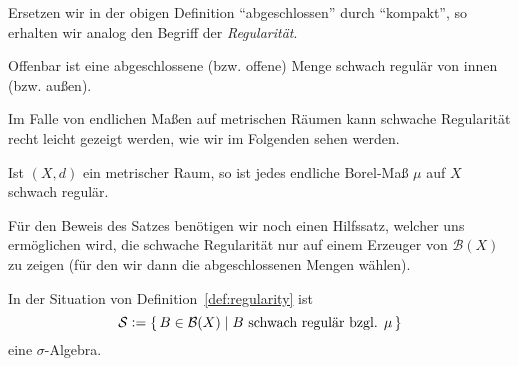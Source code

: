 \documentclass[../main/main.tex]{subfiles}
\begin{document}
	\begin{Bemerkung}
		Ersetzen wir in der obigen Definition \enquote{abgeschlossen} durch \enquote{kompakt}, 
		so erhalten wir analog den Begriff der \emph{Regularität}. 
		
		Offenbar ist eine abgeschlossene (bzw. offene) Menge schwach regulär von innen (bzw. außen).
	\end{Bemerkung}
	
	Im Falle von endlichen Maßen auf metrischen Räumen kann schwache Regularität 
	recht leicht gezeigt werden, wie wir im Folgenden sehen werden.
	
	\begin{Satz}
		\label{thm:weakregularity}
		Ist $(X, d)$ ein metrischer Raum, so ist jedes endliche Borel-Maß $\mu$ auf $X$ schwach regulär.
	\end{Satz}
	
	Für den Beweis des Satzes benötigen wir noch einen Hilfssatz, welcher 
	uns ermöglichen wird, die schwache Regularität nur auf einem Erzeuger von $\mathcal{B}(X)$ 
	zu zeigen (für den wir dann die abgeschlossenen Mengen wählen).
	
	\begin{Hilfssatz}
		\label{lem:sigmaalg}
		In der Situation von Definition~\ref{def:regularity} ist
		$$\mathcal{S} \vcentcolon = \left\{\, B \in \mathcal{B}(X) \; \middle| \; B \text{ schwach regulär bzgl. } \mu \,\right\}$$
		eine $\sigma$-Algebra.
	\end{Hilfssatz}
	
\end{document}

